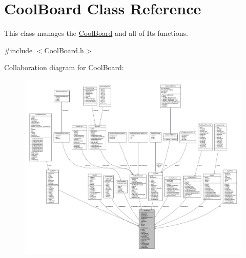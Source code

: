 \hypertarget{class_cool_board}{}\section{Cool\+Board Class Reference}
\label{class_cool_board}


This class manages the \hyperlink{class_cool_board}{Cool\+Board} and all of Its functions.  




{\ttfamily \#include $<$Cool\+Board.\+h$>$}



Collaboration diagram for Cool\+Board\+:\nopagebreak
\begin{figure}[H]
\begin{center}
\leavevmode
\includegraphics[width=350pt]{d5/d3a/class_cool_board__coll__graph}
\end{center}
\end{figure}
